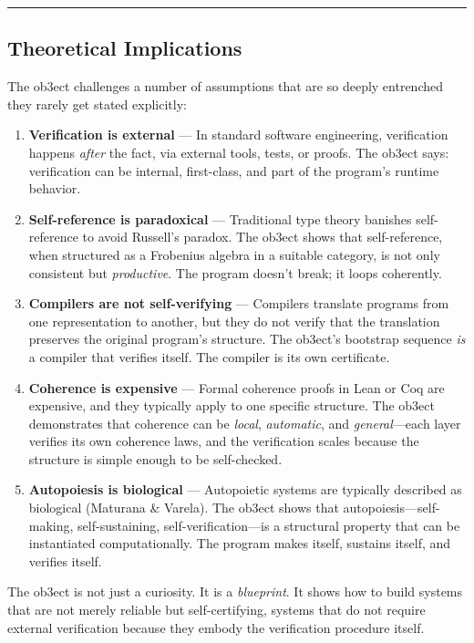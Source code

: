 \documentclass[12pt,a4paper]{article}
\begin{document}
\begin{center}
\rule{0.5\textwidth}{0.4pt}
\end{center}

\subsection{Theoretical Implications}

The ob3ect challenges a number of assumptions that are so deeply entrenched they rarely get stated explicitly:

\begin{enumerate}
    \item \textbf{Verification is external} --- In standard software engineering, verification happens \emph{after} the fact, via external tools, tests, or proofs. The ob3ect says: verification can be internal, first-class, and part of the program's runtime behavior.
    \item \textbf{Self-reference is paradoxical} --- Traditional type theory banishes self-reference to avoid Russell's paradox. The ob3ect shows that self-reference, when structured as a Frobenius algebra in a suitable category, is not only consistent but \emph{productive}. The program doesn't break; it loops coherently.
    \item \textbf{Compilers are not self-verifying} --- Compilers translate programs from one representation to another, but they do not verify that the translation preserves the original program's structure. The ob3ect's bootstrap sequence \emph{is} a compiler that verifies itself. The compiler is its own certificate.
    \item \textbf{Coherence is expensive} --- Formal coherence proofs in Lean or Coq are expensive, and they typically apply to one specific structure. The ob3ect demonstrates that coherence can be \emph{local}, \emph{automatic}, and \emph{general}---each layer verifies its own coherence laws, and the verification scales because the structure is simple enough to be self-checked.
    \item \textbf{Autopoiesis is biological} --- Autopoietic systems are typically described as biological (Maturana \& Varela). The ob3ect shows that autopoiesis---self-making, self-sustaining, self-verification---is a structural property that can be instantiated computationally. The program makes itself, sustains itself, and verifies itself.
\end{enumerate}

The ob3ect is not just a curiosity. It is a \emph{blueprint}. It shows how to build systems that are not merely reliable but self-certifying, systems that do not require external verification because they embody the verification procedure itself.
\end{document}
